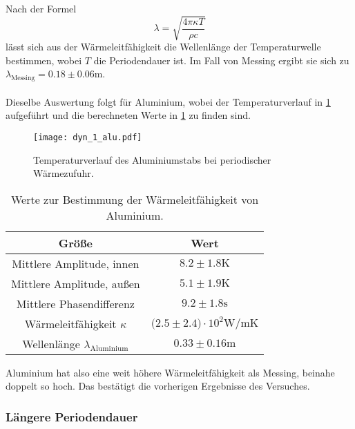   \FloatBarrier
  \noindent Nach der Formel
  \begin{equation*}
    \lambda = \sqrt{\frac{4 \pi \kappa T}{\rho c}}
  \end{equation*}
  lässt sich aus der Wärmeleitfähigkeit die Wellenlänge der Temperaturwelle bestimmen, wobei $T$ die Periodendauer ist. 
  Im Fall von Messing ergibt sie sich zu $\lambda_{\text{Messing}} = 0.18 \pm 0.06 \si{\m}$.\\
  \\
  
  \noindent Dieselbe Auswertung folgt für Aluminium, wobei der Temperaturverlauf in \ref{fig:aludyn} aufgeführt und die berechneten Werte in \ref{tab:kappaalu} zu finden sind.

  \begin{figure}
    \centering
    \texttt{[image: dyn\_1\_alu.pdf]}
    \caption{Temperaturverlauf des Aluminiumstabs bei periodischer Wärmezufuhr.}
    \label{fig:aludyn}
  \end{figure}

  \begin{table}
    \centering
    \caption{Werte zur Bestimmung der Wärmeleitfähigkeit von Aluminium.}
    \label{tab:kappaalu}
    \begin{tabular}{c c }
      \toprule
      Größe & Wert \\
      \midrule %
      Mittlere Amplitude, innen & $8.2 \pm 1.8 \si{\kelvin}$\\
      Mittlere Amplitude, außen & $5.1 \pm 1.9 \si{\kelvin}$\\
      Mittlere Phasendifferenz & $9.2 \pm 1.8 \si{\s}$ \\
      Wärmeleitfähigkeit $\kappa$ & $\bigl(2.5 \pm 2.4\bigr) \cdot 10^{2} \si{\watt\per\m\kelvin}$ \\ %
      Wellenlänge $\lambda_{\text{Aluminium}}$ & $0.33 \pm 0.16 \si{\m} $\\ 
      \bottomrule
    \end{tabular}
  \end{table}

  \FloatBarrier

  \noindent Aluminium hat also eine weit höhere Wärmeleitfähigkeit als Messing, beinahe doppelt so hoch. Das bestätigt die vorherigen Ergebnisse des Versuches.

  \subsubsection{Längere Periodendauer}

